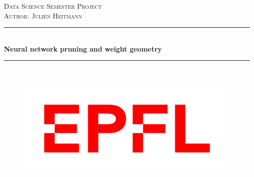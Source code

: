 \begin{titlepage}

\newcommand{\HRule}{\rule{\linewidth}{0.5mm}} %

\center %
 

\textsc{\LARGE Data Science Semester Project}\\[1.5cm] %
\textsc{\large{Author: }Julien Heitmann}\\[0.5cm] %


\HRule \\[0.6cm]
{ \huge \bfseries Neural network pruning and weight geometry}\\[0.5cm] %
\HRule \\[1.5cm]
 



\begin{figure}[!h] 
        \centering \includegraphics[width=1\columnwidth]{images/EPFL_Logo_Digital_RGB_PROD.jpg}
\end{figure}

\vfill %
\end{titlepage}
\tableofcontents
\newpage
\justify

